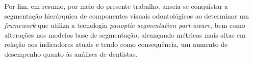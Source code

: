 Por fim, em resumo, por meio do presente trabalho, anseia-se conquistar a segmentação hierárquica de componentes visuais odontológicos ao determinar um \textit{framework} que utiliza a tecnologia \textit{panoptic segmentation part-aware}, bem como alterações nos modelos base de segmentação, alcançando métricas mais altas em relação aos indicadores atuais e tendo como consequência, um aumento de desempenho quanto às análises de dentistas.

